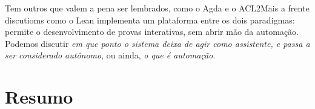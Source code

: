 Tem outros que valem a pena ser lembrados, como o Agda e o ACL2Mais a frente discutioms como o Lean implementa um plataforma entre os dois paradigmas: permite o desenvolvimento de provas interativas, sem abrir mão da automação.
Podemos discutir \textit{em que ponto o sistema deixa de agir como assistente, e passa a ser considerado autônomo}, ou ainda, \textit{o que é automação}.


\section{Resumo}
